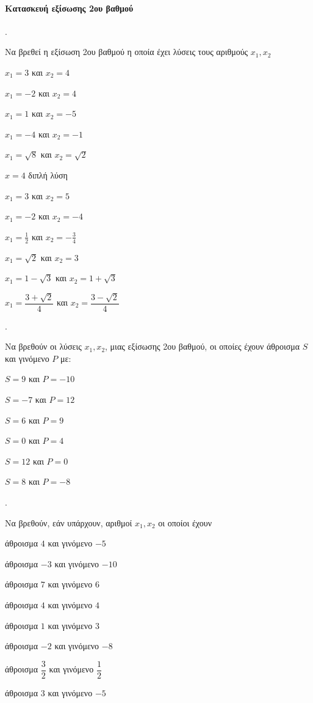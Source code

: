 \documentclass[11pt,a4paper,twocolumn]{article}
\newcounter{askhsh}
\newcommand{\askhsh}{{\large\theaskhsh.}\ \addtocounter{askhsh}{1}}
\begin{document}
\paragraph{Κατασκευή εξίσωσης 2ου βαθμού}
\askhsh Να βρεθεί η εξίσωση 2ου βαθμού η οποία έχει λύσεις τους αριθμούς $x_1,x_2$
\begin{alist}
\begin{multicols}{2}
\item $x_1=3$ και $x_2=4$
\item $x_1=-2$ και $x_2=4$
\item $x_1=1$ και $x_2=-5$
\item $x_1=-4$ και $x_2=-1$
\item $x_1=\sqrt{8}$ και $x_2=\sqrt{2}$
\item $x=4$ διπλή λύση
\item $ x_1=3 $ και $ x_2=5 $
\item $ x_1=-2 $ και $ x_2=-4 $
\item $ x_1=\frac{1}{2} $ και $ x_2=-\frac{3}{4} $
\item $ x_1=\sqrt{2} $ και $ x_2=3 $
\end{multicols}
\item $x_1=1-\sqrt{3}$ και $x_2=1+\sqrt{3}$
\item $x_1=\dfrac{3+\sqrt{2}}{4}$ και $x_2=\dfrac{3-\sqrt{2}}{4}$
\end{alist}
\askhsh
Να βρεθούν οι λύσεις $ x_1, x_2 $, μιας εξίσωσης 2{ου} βαθμού, οι οποίες έχουν άθροισμα $ S $ και γινόμενο $ P $ με:
\begin{multicols}{2}
\begin{alist}[leftmargin=5mm]
\item $ S=9 $ και $ P=-10 $
\item $ S=-7 $ και $ P=12 $
\item $ S=6 $ και $ P=9 $
\item $ S=0 $ και $ P=4 $
\item $ S=12 $ και $ P=0 $
\item $ S=8 $ και $ P=-8 $
\end{alist}
\end{multicols}
\askhsh Να βρεθούν, εάν υπάρχουν, αριθμοί $x_1,x_2$ οι οποίοι έχουν
\begin{alist}
\item άθροισμα $4$ και γινόμενο $-5$
\item άθροισμα $-3$ και γινόμενο $-10$
\item άθροισμα $7$ και γινόμενο $6$
\item άθροισμα $4$ και γινόμενο $4$
\item άθροισμα $1$ και γινόμενο $3$
\item άθροισμα $-2$ και γινόμενο $-8$
\item άθροισμα $\dfrac{3}{2}$ και γινόμενο $\dfrac{1}{2}$
\item άθροισμα $3$ και γινόμενο $-5$
\end{alist}
\end{document}
